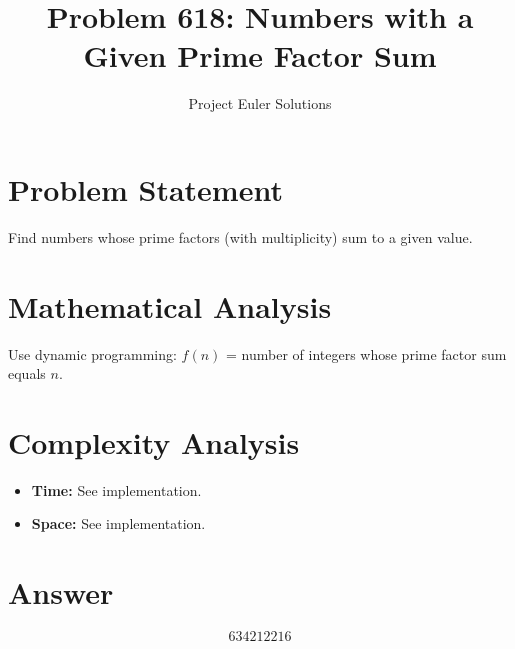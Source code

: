 \documentclass[11pt]{article}
\title{Problem 618: Numbers with a Given Prime Factor Sum}
\author{Project Euler Solutions}
\date{}
\begin{document}
\maketitle

\section{Problem Statement}
Find numbers whose prime factors (with multiplicity) sum to a given value.

\section{Mathematical Analysis}
Use dynamic programming: $f(n)$ = number of integers whose prime factor sum equals $n$.

\section{Complexity Analysis}
\begin{itemize}
    \item \textbf{Time:} See implementation.
    \item \textbf{Space:} See implementation.
\end{itemize}

\section{Answer}

\[
\boxed{634212216}
\]
\end{document}
